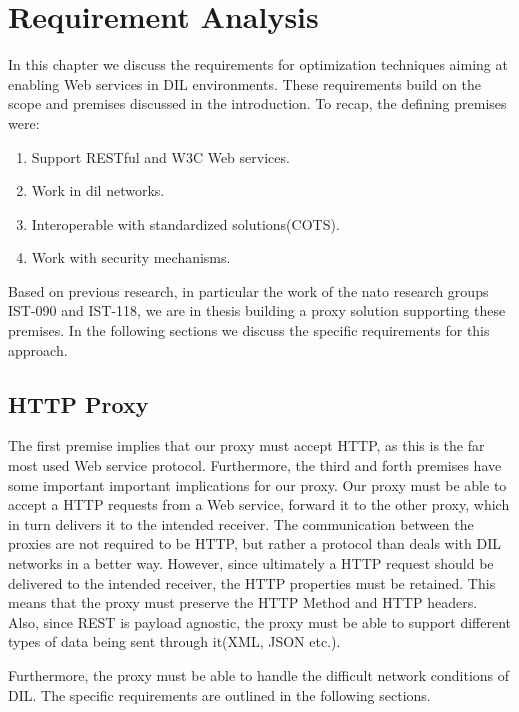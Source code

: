 \chapter{Requirement Analysis}

In this chapter we discuss the requirements for optimization techniques aiming
at enabling Web services in DIL environments. These requirements build on the
scope and premises discussed in the introduction. To recap, the defining
premises were:

\begin{enumerate}
    \item Support RESTful and W3C Web services.
    \item Work in \gls{dil} networks.
    \item Interoperable with standardized solutions(COTS).
    \item Work with security mechanisms.
\end{enumerate}

Based on previous research, in particular the work of the \gls{nato}
research groups IST-090 and IST-118, we are in thesis building a proxy solution
supporting these premises. In the following sections we discuss the specific requirements
for this approach.

\section{HTTP Proxy}

The first premise implies that our proxy must accept HTTP, as this is the far
most used Web service protocol. Furthermore, the third and forth premises have
some important important implications for our proxy. Our proxy must be able to
accept a HTTP requests from a Web service, forward it to the other proxy, which
in turn delivers it to the intended receiver. The communication between the
proxies are not required to be HTTP, but rather a protocol than deals with DIL
networks in a better way. However, since ultimately a HTTP request should be
delivered to the intended receiver, the HTTP properties must be retained. This
means that the proxy must preserve the HTTP Method and HTTP headers. Also, since
REST is payload agnostic, the proxy must be able to support different types of
data being sent through it(XML, JSON etc.).

Furthermore, the proxy must be able to handle the difficult network conditions
of DIL. The specific requirements are outlined in the following sections.

